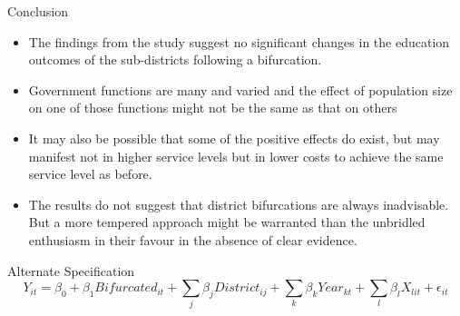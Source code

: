 \documentclass{beamer}
\begin{document}
				\begin{frame}{Conclusion}
					\begin{itemize}
						\item  The findings from the study suggest no significant changes in the education outcomes of the sub-districts following a bifurcation.
						\item Government functions are many and varied and the effect of population size on one of those functions might not be the same as that on others
						\item It may also be possible that some of the positive effects do exist, but may manifest not in higher service levels but in lower costs to achieve the same service level as before.
						\item The results do not suggest that district bifurcations are always inadvisable. But a more tempered approach might be warranted than the unbridled enthusiasm in their favour in the absence of clear evidence.
					\end{itemize}
				\end{frame}
				
				\begin{frame}{Alternate Specification}
					\[ Y_{it} = \beta_0 + \beta_1 Bifurcated_{it} + \sum_{j} \beta_j District_{ij} + \sum_{k} \beta_k Year_{kt} + \sum_l \beta_l X_{lit} + \epsilon_{it} \]
				\end{frame}
				
			
\end{document}
